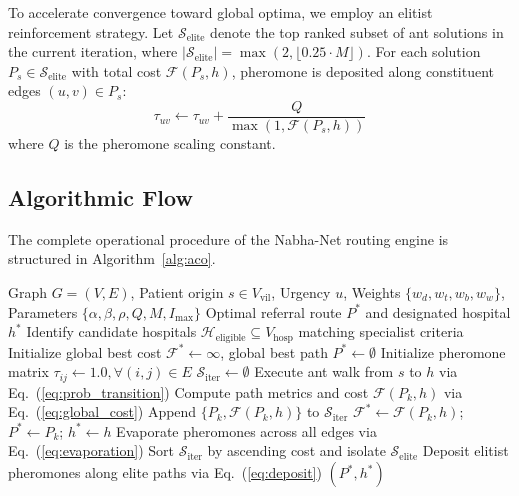 \documentclass[conference]{IEEEtran}
\begin{document}
To accelerate convergence toward global optima, we employ an elitist reinforcement strategy. Let $\mathcal{S}_{\text{elite}}$ denote the top ranked subset of ant solutions in the current iteration, where $|\mathcal{S}_{\text{elite}}| = \max(2, \lfloor 0.25 \cdot M \rfloor)$. For each solution $P_s \in \mathcal{S}_{\text{elite}}$ with total cost $\mathcal{F}(P_s, h)$, pheromone is deposited along constituent edges $(u, v) \in P_s$:
\begin{equation}
\tau_{uv} \leftarrow \tau_{uv} + \frac{Q}{\max(1, \mathcal{F}(P_s, h))}
\label{eq:deposit}
\end{equation}
where $Q$ is the pheromone scaling constant.

\subsection{Algorithmic Flow}
The complete operational procedure of the Nabha-Net routing engine is structured in Algorithm~\ref{alg:aco}.

\begin{algorithm}[htbp]
\caption{Nabha-Net Multi-Objective ACO Referral}
\label{alg:aco}
\begin{algorithmic}[1]
\REQUIRE Graph $G=(V, E)$, Patient origin $s \in V_{\text{vil}}$, Urgency $u$, Weights $\{w_d, w_t, w_b, w_w\}$, Parameters $\{\alpha, \beta, \rho, Q, M, I_{\max}\}$
\ENSURE Optimal referral route $P^*$ and designated hospital $h^*$
\STATE Identify candidate hospitals $\mathcal{H}_{\text{eligible}} \subseteq V_{\text{hosp}}$ matching specialist criteria
\STATE Initialize global best cost $\mathcal{F}^* \leftarrow \infty$, global best path $P^* \leftarrow \emptyset$
    \STATE Initialize pheromone matrix $\tau_{ij} \leftarrow 1.0, \forall (i, j) \in E$
        \STATE $\mathcal{S}_{\text{iter}} \leftarrow \emptyset$
            \STATE Execute ant walk from $s$ to $h$ via Eq.~(\ref{eq:prob_transition})
                \STATE Compute path metrics and cost $\mathcal{F}(P_k, h)$ via Eq.~(\ref{eq:global_cost})
                \STATE Append $\{P_k, \mathcal{F}(P_k, h)\}$ to $\mathcal{S}_{\text{iter}}$
                    \STATE $\mathcal{F}^* \leftarrow \mathcal{F}(P_k, h)$; $P^* \leftarrow P_k$; $h^* \leftarrow h$
                \ENDIF
            \ENDIF
        \ENDFOR
        \STATE Evaporate pheromones across all edges via Eq.~(\ref{eq:evaporation})
        \STATE Sort $\mathcal{S}_{\text{iter}}$ by ascending cost and isolate $\mathcal{S}_{\text{elite}}$
        \STATE Deposit elitist pheromones along elite paths via Eq.~(\ref{eq:deposit})
    \ENDFOR
\ENDFOR
\RETURN $(P^*, h^*)$
\end{algorithmic}
\end{algorithm}
\end{document}
